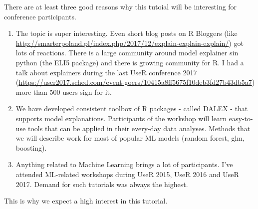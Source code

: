 \documentclass[]{book}
\theoremstyle{definition}
\theoremstyle{definition}
\theoremstyle{definition}
\theoremstyle{remark}
\begin{document}
There are at least three good reasons why this tutoial will be
interesting for conference participants.

\begin{enumerate}
\def\labelenumi{\arabic{enumi})}
\item
  The topic is super interesting. Even short blog posts on R Bloggers
  (like
  \url{http://smarterpoland.pl/index.php/2017/12/explain-explain-explain/})
  got lots of reactions. There is a large community around model
  explainer sin python (the ELI5 package) and there is growing community
  for R. I had a talk about explainers during the last UseR conference
  2017
  (\url{https://user2017.sched.com/event-goers/10415a8ff5675f10deb3fd27b43db5a7})
  more than 500 users sign for it.
\item
  We have developed consistent toolbox of R packages - called DALEX -
  that supports model explanations. Participants of the workshop will
  learn easy-to-use tools that can be applied in their every-day data
  analyses. Methods that we will describe work for most of popular ML
  models (random forest, glm, boosting).
\item
  Anything related to Machine Learning brings a lot of participants.
  I've attended ML-related workshops during UseR 2015, UseR 2016 and
  UseR 2017. Demand for such tutorials was always the highest.
\end{enumerate}

This is why we expect a high interest in this tutorial.


\end{document}
